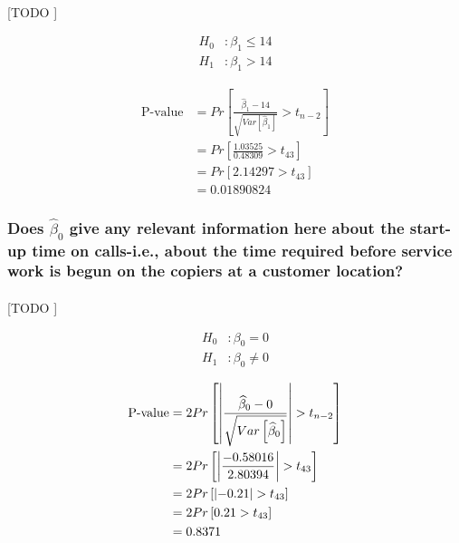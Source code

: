 \documentclass{article}
\begin{document}
        \paragraph{}
        [TODO ]

        \begin{equation}
          \begin{split}
            H_0&: \beta_1 \leq 14 \\
            H_1&: \beta_1 > 14
          \end{split}
        \end{equation}


        \begin{equation}
          \begin{split}
            \text{P-value} &= Pr\left[\frac{\widehat{\beta}_1 - 14}{\sqrt{Var\left[\widehat{\beta}_1\right]}} > t_{n-2}\right] \\
            &= Pr\left[\frac{1.03525}{0.48309} > t_{43}\right] \\
            &= Pr\left[2.14297 > t_{43}\right] \\
            &= 0.01890824
          \end{split}
        \end{equation}


      \subsubsection{Does $\widehat{\beta}_0$ give any relevant information here about the start-up time on calls-i.e., about the time required before service work is begun on the copiers at a customer location?}

        \paragraph{}
        [TODO ]

        \begin{equation}
          \begin{split}
            H_0&: \beta_0 = 0 \\
            H_1&: \beta_0 \neq 0
          \end{split}
        \end{equation}

        \begin{equation}
          \begin{split}
            \text{P-value} &= 2Pr\left[\abs{\frac{\widehat{\beta}_0 - 0}{\sqrt{Var\left[\widehat{\beta}_0\right]}}} > t_{n-2}\right] \\
            &= 2Pr\left[\abs{\frac{-0.58016}{2.80394}} > t_{43}\right] \\
            &= 2Pr\left[\abs{-0.21} > t_{43} \right] \\
            &= 2Pr\left[0.21 > t_{43} \right] \\
            &= 0.8371
          \end{split}
        \end{equation}
\end{document}
